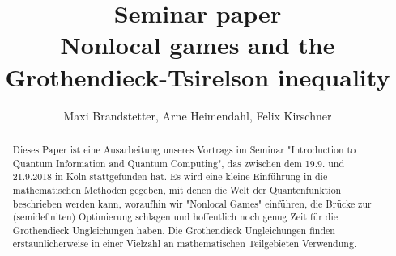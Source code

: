 

\title{Seminar paper \\ Nonlocal games and the Grothendieck-Tsirelson inequality}
\author{Maxi Brandstetter, Arne Heimendahl, Felix Kirschner}





\begin{abstract}
Dieses Paper ist eine Ausarbeitung unseres Vortrags im Seminar "Introduction to Quantum Information and Quantum Computing", das zwischen dem 19.9. und 21.9.2018 in Köln stattgefunden hat. Es wird eine kleine Einführung in die mathematischen Methoden gegeben, mit denen die Welt der Quantenfunktion beschrieben werden kann, woraufhin wir "Nonlocal Games" einführen, die Brücke zur (semidefiniten) Optimierung schlagen und hoffentlich noch genug Zeit für die Grothendieck Ungleichungen haben. Die Grothendieck Ungleichungen finden erstaunlicherweise in einer Vielzahl an mathematischen Teilgebieten Verwendung.
\end{abstract}


\maketitle	
\tableofcontents
	
	
\newpage	
{}



	\vspace{8pt}
%	


\let \oldsection \section
\renewcommand{\section}{\vspace{15pt plus 8pt}\oldsection}
\let \oldsubsection \subsection
\renewcommand{\subsection}{\vspace{10pt plus 3pt}\oldsubsection}



